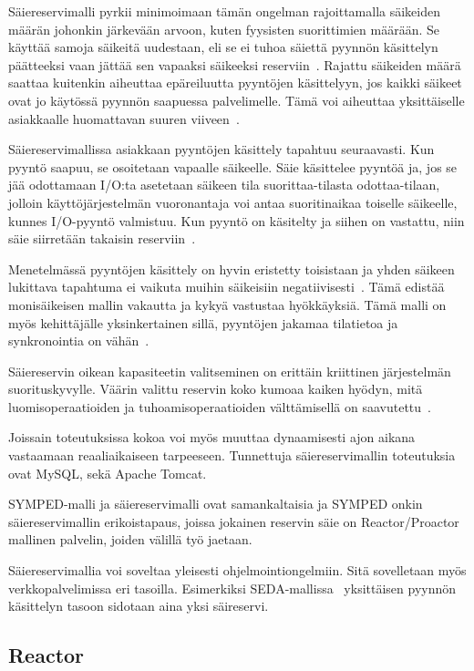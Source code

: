 \documentclass[finnish]{tktltiki2}
\theoremstyle{definition}
\theoremstyle{remark}
\begin{document}
Säiereservimalli pyrkii minimoimaan tämän ongelman rajoittamalla
säikeiden määrän johonkin järkevään arvoon, kuten fyysisten suorittimien
määrään. Se käyttää samoja säikeitä uudestaan, eli se ei tuhoa säiettä
pyynnön käsittelyn päätteeksi vaan jättää sen vapaaksi säikeeksi reserviin~\cite{ling_analysis_2000}. Rajattu säikeiden määrä saattaa kuitenkin aiheuttaa epäreiluutta
pyyntöjen käsittelyyn, jos kaikki säikeet ovat jo käytössä pyynnön
saapuessa palvelimelle. Tämä voi aiheuttaa yksittäiselle asiakkaalle
huomattavan suuren viiveen~\cite{welsh_seda_2001}.

Säiereservimallissa asiakkaan pyyntöjen käsittely tapahtuu seuraavasti.
Kun pyyntö saapuu, se osoitetaan vapaalle säikeelle. Säie käsittelee pyyntöä ja,
jos se jää odottamaan I/O:ta asetetaan säikeen tila suorittaa-tilasta odottaa-tilaan,
jolloin käyttöjärjestelmän vuoronantaja voi antaa suoritinaikaa toiselle säikeelle,
kunnes I/O-pyyntö valmistuu. Kun pyyntö on käsitelty ja siihen on vastattu, niin
säie siirretään takaisin reserviin~\cite{ling_analysis_2000}.

Menetelmässä pyyntöjen käsittely on hyvin eristetty toisistaan ja
yhden säikeen lukittava tapahtuma ei vaikuta muihin säikeisiin negatiivisesti~\cite{davis_case_2017}.
Tämä edistää monisäikeisen mallin vakautta ja kykyä vastustaa hyökkäyksiä.
Tämä malli on myös kehittäjälle yksinkertainen sillä, pyyntöjen jakamaa tilatietoa
ja synkronointia on vähän~\cite{hu_applying_1998}.

Säiereservin oikean kapasiteetin valitseminen on erittäin kriittinen
järjestelmän suorituskyvylle.
Väärin valittu reservin koko kumoaa kaiken hyödyn, mitä luomisoperaatioiden
ja tuhoamisoperaatioiden välttämisellä on saavutettu~\cite{ling_analysis_2000}.

Joissain toteutuksissa kokoa voi myös muuttaa dynaamisesti ajon aikana vastaamaan
reaaliaikaiseen tarpeeseen.
Tunnettuja säiereservimallin toteutuksia ovat MySQL, sekä Apache Tomcat.

SYMPED-malli ja säiereservimalli ovat samankaltaisia ja SYMPED onkin
säiereservimallin erikoistapaus, joissa jokainen reservin säie on
Reactor/Proactor mallinen palvelin,
joiden välillä työ jaetaan.

Säiereservimallia voi soveltaa yleisesti ohjelmointiongelmiin. Sitä
sovelletaan myös verkkopalvelimissa eri tasoilla. Esimerkiksi
SEDA-mallissa~\cite{welsh_seda_2001}
yksittäisen pyynnön käsittelyn tasoon sidotaan aina yksi säireservi.

\subsection{Reactor}
\end{document}
